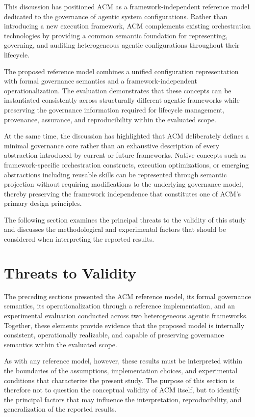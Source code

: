 \documentclass[10pt]{article}
\begin{document}
This discussion has positioned ACM as a framework-independent reference model dedicated to the governance of agentic system configurations. Rather than introducing a new execution framework, ACM complements existing orchestration technologies by providing a common semantic foundation for representing, governing, and auditing heterogeneous agentic configurations throughout their lifecycle.

The proposed reference model combines a unified configuration representation with formal governance semantics and a framework-independent operationalization. The evaluation demonstrates that these concepts can be instantiated consistently across structurally different agentic frameworks while preserving the governance information required for lifecycle management, provenance, assurance, and reproducibility within the evaluated scope.

At the same time, the discussion has highlighted that ACM deliberately defines a minimal governance core rather than an exhaustive description of every abstraction introduced by current or future frameworks. Native concepts such as framework-specific orchestration constructs, execution optimizations, or emerging abstractions including reusable skills can be represented through semantic projection without requiring modifications to the underlying governance model, thereby preserving the framework independence that constitutes one of ACM's primary design principles.

The following section examines the principal threats to the validity of this study and discusses the methodological and experimental factors that should be considered when interpreting the reported results.

\section{Threats to Validity}
\label{sec:threats_validity}

The preceding sections presented the ACM reference model, its formal governance semantics, its operationalization through a reference implementation, and an experimental evaluation conducted across two heterogeneous agentic frameworks. Together, these elements provide evidence that the proposed model is internally consistent, operationally realizable, and capable of preserving governance semantics within the evaluated scope.

As with any reference model, however, these results must be interpreted within the boundaries of the assumptions, implementation choices, and experimental conditions that characterize the present study. The purpose of this section is therefore not to question the conceptual validity of ACM itself, but to identify the principal factors that may influence the interpretation, reproducibility, and generalization of the reported results.
\end{document}
